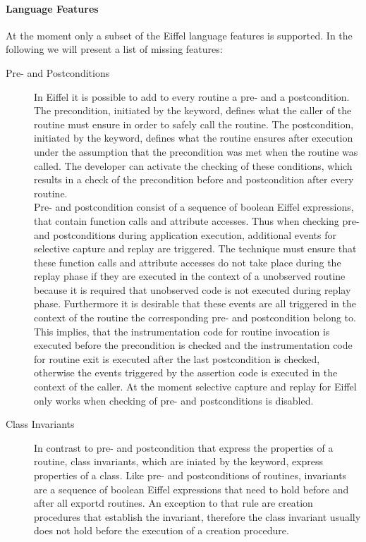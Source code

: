\paragraph{Language Features}
At the moment only a subset of the Eiffel language features is supported. In the following we will present a list of missing features:

\begin{description}
 \item [Pre- and Postconditions] In Eiffel it is possible to add to every routine a pre- and a postcondition. The precondition, initiated by the  keyword, defines what the caller of the routine must ensure in order to safely call the routine. The postcondition, initiated by the  keyword, defines what the routine ensures after execution under the assumption that the precondition was met when the routine was called. The developer can activate the checking of these conditions, which results in a check of the precondition before and postcondition after every routine.\\
 Pre- and postcondition consist of a sequence of boolean Eiffel expressions, that contain function calls and attribute accesses. Thus when checking pre- and postconditions during application execution, additional events for selective capture and replay are triggered. The technique must ensure that these function calls and attribute accesses do not take place during the replay phase if they are executed in the context of a unobserved routine because it is required that unobserved code is not executed during replay phase. Furthermore it is desirable that these events are all triggered in the context of the routine the corresponding pre- and postcondition belong to. This implies, that the instrumentation code for routine invocation is executed before the precondition is checked and the instrumentation code for routine exit is executed after the last postcondition is checked, otherwise the events triggered by the assertion code is executed in the context of the caller. At the moment selective capture and replay for Eiffel only works when checking of pre- and postconditions is disabled.
 \item [Class Invariants] In contrast to pre- and postcondition that express the properties of a routine, class invariants, which are iniated by the  keyword, express properties of a class. Like pre- and postconditions of routines, invariants are a sequence of boolean Eiffel expressions that need to hold before and after all exportd routines. An exception to that rule are creation procedures that establish the invariant, therefore the class invariant usually does not hold before the execution of a creation procedure.\\

\end{description}
